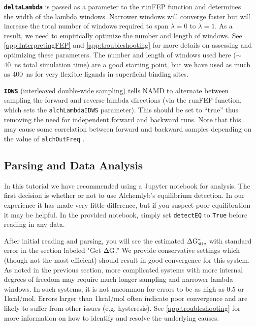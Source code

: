 \documentclass[9pt,tutorial]{Styling/livecoms}
\newcommand{\textInput}[1]{
  \texttt{#1}
}
\begin{document}
\textbf{\textInput{deltaLambda}} is passed as a parameter to the runFEP function and determines the width of the lambda windows. Narrower windows will converge faster but will increase the total number of windows required to span $\lambda=0$ to $\lambda=1$. 
As a result, we need to empirically optimize the number and length of windows. 
See \ref{app:InterpretingFEP} and \ref{app:troubleshooting} for more details on assessing and optimizing these parameters. 
The number and length of windows used here ($\sim$ 40~ns total simulation time) are a good starting point, but we have used as much as 400~ns for very flexible ligands in superficial binding sites\cite{Petroff2022}.

\textbf{\textInput{IDWS}} (interleaved double-wide sampling) 
tells NAMD to alternate between sampling the forward and reverse lambda directions (via the runFEP function, which sets the \textInput{alchLambdaIDWS} parameter). This should be set to ``true'' thus removing the need for independent forward and backward runs. Note that this may cause some correlation between forward and backward samples depending on the value of \textInput{alchOutFreq}.

\subsection{Parsing and Data Analysis}\label{app:Analysis}
In this tutorial we have recommended using a Jupyter notebook for analysis. The first decision is whether or not to use Alchemlyb's equilibrium detection. In our experience it has made very little difference, but if you suspect poor equilibration it may be helpful. In the provided notebook, simply set \textInput{detectEQ} to \textInput{True} before reading in any data.

After initial reading and parsing, you will see the estimated $\Delta \rm{G}_{\rm{site}}^*$ with standard error in the section labeled "Get $\Delta \rm G$.'' We provide conservative settings which (though not the most efficient) should result in good convergence for this system. As noted in the previous section, more complicated systems with more internal degrees of freedom may require much longer sampling and narrower lambda windows. In such systems, it is not uncommon for errors to be as high as 0.5 or 1kcal/mol. Errors larger than 1kcal/mol often indicate poor convergence and are likely to suffer from other issues (e.g. hysteresis). See \ref{app:troubleshooting} for more information on how to identify and resolve the underlying causes.
\end{document}
